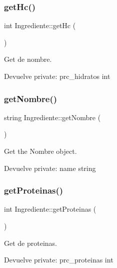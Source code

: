 \subsubsection{\texorpdfstring{get\+Hc()}{getHc()}}
{\footnotesize\ttfamily int Ingrediente\+::get\+Hc (\begin{DoxyParamCaption}{ }\end{DoxyParamCaption})}



Get de nombre. 

\begin{DoxyReturn}{Devuelve}
private\+: prc\+\_\+hidratos int 
\end{DoxyReturn}
\mbox{\label{classIngrediente_acabd25ebac52f95530cf35c1609c6ce2}} 
\subsubsection{\texorpdfstring{get\+Nombre()}{getNombre()}}
{\footnotesize\ttfamily string Ingrediente\+::get\+Nombre (\begin{DoxyParamCaption}{ }\end{DoxyParamCaption})}



Get the Nombre object. 

\begin{DoxyReturn}{Devuelve}
private\+: name string 
\end{DoxyReturn}
\mbox{\label{classIngrediente_a8ae9688c30eb438cf8988c4707dc38d1}} 
\subsubsection{\texorpdfstring{get\+Proteinas()}{getProteinas()}}
{\footnotesize\ttfamily int Ingrediente\+::get\+Proteinas (\begin{DoxyParamCaption}{ }\end{DoxyParamCaption})}



Get de proteinas. 

\begin{DoxyReturn}{Devuelve}
private\+: prc\+\_\+proteinas int 
\end{DoxyReturn}
\mbox{\label{classIngrediente_ae44bb56a5b2a8d3bc532b053aba8e52a}} 
